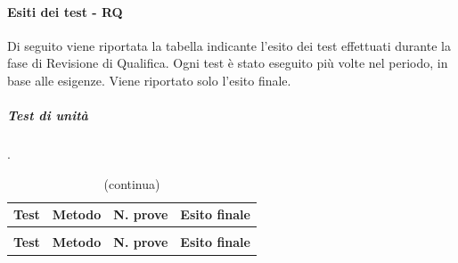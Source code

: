 		\paragraph{Esiti dei test - RQ}
	
	Di seguito viene riportata la tabella indicante l'esito dei test effettuati durante la fase di Revisione di Qualifica. Ogni test è stato eseguito più volte nel periodo, in base alle esigenze. Viene riportato solo l'esito finale.
	
	\subparagraph{Test di unità} {\color{white}.}
	
	\renewcommand{\arraystretch}{1.5}
	
	\begin{longtable}{ >{\centering}p{}  >{\centering}p{} >{\centering}p{}
			>{\centering}p{}}
		
		\caption{   Esito test di unità - RQ}\\	
		\rowcolorhead
		\centering\textbf{\color{white}Test} 
		& \centering\textbf{\color{white}Metodo} 
		& \centering\textbf{\color{white}N. prove}
		& \centering\textbf{\color{white}Esito finale}
		
		\tabularnewline %
		\endfirsthead	
		
		\rowcolor{white}\caption[]{(continua)}\\	
		\rowcolorhead
		\centering\textbf{\color{white}Test} 
		& \centering\textbf{\color{white}Metodo} 
		& \centering\textbf{\color{white}N. prove}
		& \centering\textbf{\color{white}Esito finale}
		
		\tabularnewline %
		\endhead	
		

\end{longtable}
